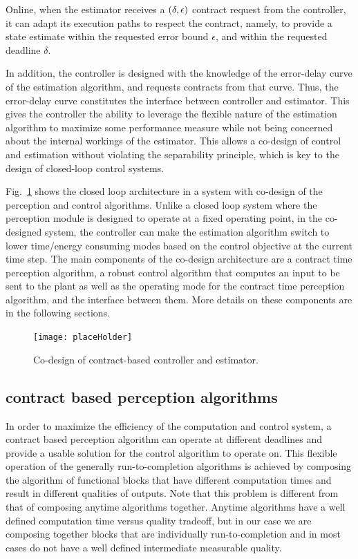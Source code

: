 Online, when the estimator receives a $(\delta,\epsilon)$ contract request from the controller, it can adapt its execution paths to respect the contract, namely, to provide a state estimate within the requested error bound $\epsilon$, and within the requested deadline $\delta$.

In addition, the controller is designed with the knowledge of the error-delay curve of the estimation algorithm, and requests contracts from that curve.
Thus, the error-delay curve constitutes the interface between controller and estimator.
This gives the controller the ability to leverage the flexible nature of the estimation algorithm to maximize some performance measure while not being concerned about the internal workings of the estimator. 
This allows a co-design of control and estimation without violating the separability principle, which is key to the design of closed-loop control systems.

Fig.~\ref{fig:fullcodesignedCE} shows the closed loop architecture in a system with co-design of the perception and control algorithms. 
Unlike a closed loop system where the perception module is designed to operate at a fixed operating point, in the co-designed system, the controller can make the estimation algorithm switch to lower time/energy consuming modes based on the control objective at the current time step.
The main components of the co-design architecture are a contract time perception algorithm, a robust control algorithm that computes an input to be sent to the plant as well as the operating mode for the contract time perception algorithm, and the interface between them. More details on these components are in the following sections.

\begin{figure}[t]
	\centering
		\texttt{[image: placeHolder]}
		\label{fig:fullcodesignedCE}
		\caption{Co-design of contract-based controller and estimator.}			
\end{figure}

\subsection{contract based perception algorithms}

In order to maximize the efficiency of the computation and control system, a contract based perception algorithm can operate at different deadlines and provide a usable solution for the control algorithm to operate on. This flexible operation of the generally run-to-completion algorithms is achieved by composing the algorithm of functional blocks that have different computation times and result in different qualities of outputs. Note that this problem is different from that of composing anytime algorithms together. Anytime algorithms have a well defined computation time versus quality tradeoff, but in our case we are composing together blocks that are individually run-to-completion and in most cases do not have a well defined intermediate measurable quality.

